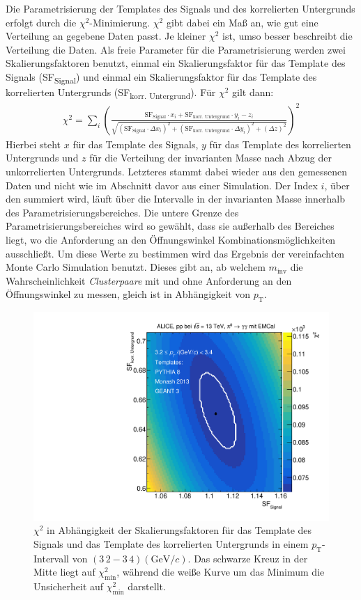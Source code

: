 Die Parametrisierung der Templates des Signals und des korrelierten Untergrunds erfolgt durch die $\chi^{2}$-Minimierung.
$\chi^{2}$ gibt dabei ein Maß an, wie gut eine Verteilung an gegebene Daten passt.
Je kleiner $\chi^{2}$ ist, umso besser beschreibt die Verteilung die Daten.
Als freie Parameter für die Parametrisierung werden zwei Skalierungsfaktoren benutzt, einmal ein Skalierungsfaktor für das Template des Signals (SF\textsubscript{Signal}) und einmal ein Skalierungsfaktor für das Template des korrelierten Untergrunds (SF\textsubscript{korr. Untergrund}).
Für $\chi^{2}$ gilt dann:
\begin{align}
\chi^{2} = \sum_{i}\left(\frac{\text{SF}_\text{Signal}\cdot x_{i}+\text{SF}_\text{korr. Untergrund}\cdot y_{i}-z_{i}}{\sqrt{\left(\text{SF}_\text{Signal}\cdot\Delta x_{i}\right)^{2}+\left(\text{SF}_\text{korr. Untergrund}\cdot\Delta y_{i}\right)^{2}+\left(\Delta z\right)^{2}}}\right)^{2}
\label{eq:Chi2}
\end{align}
Hierbei steht $x$ für das Template des Signals, $y$ für das Template des korrelierten Untergrunds und $z$ für die Verteilung der invarianten Masse nach Abzug der unkorrelierten Untergrunds.
Letzteres stammt dabei wieder aus den gemessenen Daten und nicht wie im Abschnitt davor aus einer Simulation.
Der Index $i$, über den summiert wird, läuft über die Intervalle in der invarianten Masse innerhalb des Parametrisierungsbereiches.
Die untere Grenze des Parametrisierungsbereiches wird so gewählt, dass sie außerhalb des Bereiches liegt, wo die Anforderung an den Öffnungswinkel Kombinationsmöglichkeiten ausschließt.
Um diese Werte zu bestimmen wird das Ergebnis der vereinfachten Monte Carlo Simulation benutzt.
Dieses gibt an, ab welchem $m_\text{inv}$ die Wahrscheinlichkeit \textit{Clusterpaare} mit und ohne Anforderung an den Öffnungswinkel zu messen, gleich ist in Abhängigkeit von $p_\text{T}$.
\begin{figure}[t!]
\centering
\includegraphics[width=.65\linewidth]{Chi2Map10_Data_2016.pdf}
\caption{$\chi^{2}$ in Abhängigkeit der Skalierungsfaktoren für das Template des Signals und das Template des korrelierten Untergrunds in einem $p_{\text{T}}$-Intervall von $(3\,2 - 3\,4)(\text{GeV}/c)$.
Das schwarze Kreuz in der Mitte liegt auf $\chi^{2}_\text{min}$, während die weiße Kurve um das Minimum die Unsicherheit auf $\chi^{2}_\text{min}$ darstellt.}
\label{fig:Chi2Map}
\end{figure}
